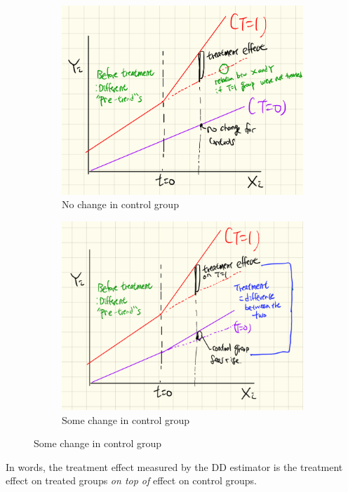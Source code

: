 \begin{figure}[H]
\centering 
\caption{DD estimator}
\begin{subfigure}[b]{.4\textwidth}
\includegraphics[width=\textwidth]{fig1_1.png}
\caption{No change in control group}
\end{subfigure}
\begin{subfigure}[b]{.4\textwidth}
\includegraphics[width=\textwidth]{fig1_2.png}
\caption{Some change in control group}
\end{subfigure}
\end{figure}
In words, the treatment effect measured by the DD estimator is the treatment effect on treated groups \textit{on top of} effect on control groups. 
